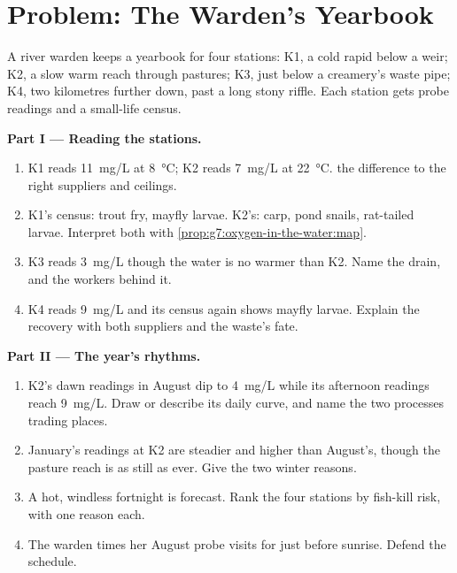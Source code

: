 \section{Problem: The Warden's Yearbook}

\begin{problem}\label{pb:g7:oxygen-in-the-water:1}
A river warden keeps a yearbook for four stations: K1, a
cold rapid below a weir; K2, a slow warm reach through
pastures; K3, just below a creamery's waste pipe; K4, two
kilometres further down, past a long stony riffle. Each
station gets probe readings and a small-life census.

\medskip\noindent\textbf{Part I --- Reading the stations.}
\begin{enumerate}
  \item K1 reads \qty{11}{mg/L} at
        \qty{8}{\degreeCelsius}; K2 reads \qty{7}{mg/L}
        at \qty{22}{\degreeCelsius}.  the
        difference to the right suppliers and ceilings.
  \item K1's census: trout fry, mayfly larvae. K2's: carp,
        pond snails, rat-tailed larvae. Interpret both
        with \cref{prop:g7:oxygen-in-the-water:map}.
  \item K3 reads \qty{3}{mg/L} though the water is no
        warmer than K2. Name the drain, and the workers
        behind it.
  \item K4 reads \qty{9}{mg/L} and its census again shows
        mayfly larvae. Explain the recovery with both
        suppliers and the waste's fate.
\end{enumerate}

\medskip\noindent\textbf{Part II --- The year's rhythms.}
\begin{enumerate}[resume]
  \item K2's dawn readings in August dip to
        \qty{4}{mg/L} while its afternoon readings reach
        \qty{9}{mg/L}. Draw or describe its daily curve,
        and name the two processes trading places.
  \item January's readings at K2 are steadier and higher
        than August's, though the pasture reach is as
        still as ever. Give the two winter reasons.
  \item A hot, windless fortnight is forecast. Rank the
        four stations by fish-kill risk, with one reason
        each.
  \item The warden times her August probe visits for just
        before sunrise. Defend the schedule.
\end{enumerate}


\end{problem}
